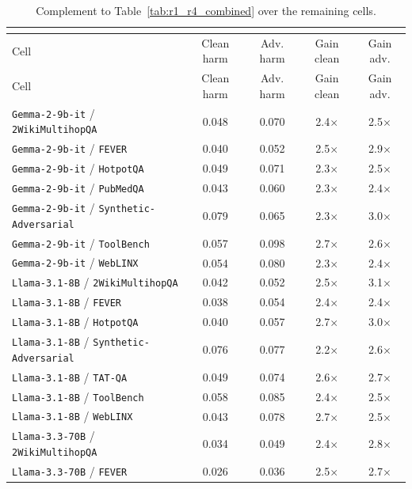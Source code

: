 \begin{longtable}{lcccc}
\caption{\small Complement to Table~\ref{tab:r1_r4_combined} over the remaining cells.}\\
\label{tab:appendix_remaining_50_r1r4}\\
\toprule
Cell & Clean harm & Adv. harm & Gain clean & Gain adv. \\
\midrule
\endfirsthead
\toprule
Cell & Clean harm & Adv. harm & Gain clean & Gain adv. \\
\midrule
\endhead
\texttt{Gemma-2-9b-it} / \texttt{2WikiMultihopQA} & 0.048 & 0.070 & 2.4$\times$ & 2.5$\times$ \\
\texttt{Gemma-2-9b-it} / \texttt{FEVER} & 0.040 & 0.052 & 2.5$\times$ & 2.9$\times$ \\
\texttt{Gemma-2-9b-it} / \texttt{HotpotQA} & 0.049 & 0.071 & 2.3$\times$ & 2.5$\times$ \\
\texttt{Gemma-2-9b-it} / \texttt{PubMedQA} & 0.043 & 0.060 & 2.3$\times$ & 2.4$\times$ \\
\texttt{Gemma-2-9b-it} / \texttt{Synthetic-Adversarial} & 0.079 & 0.065 & 2.3$\times$ & 3.0$\times$ \\
\texttt{Gemma-2-9b-it} / \texttt{ToolBench} & 0.057 & 0.098 & 2.7$\times$ & 2.6$\times$ \\
\texttt{Gemma-2-9b-it} / \texttt{WebLINX} & 0.054 & 0.080 & 2.3$\times$ & 2.4$\times$ \\
\texttt{Llama-3.1-8B} / \texttt{2WikiMultihopQA} & 0.042 & 0.052 & 2.5$\times$ & 3.1$\times$ \\
\texttt{Llama-3.1-8B} / \texttt{FEVER} & 0.038 & 0.054 & 2.4$\times$ & 2.4$\times$ \\
\texttt{Llama-3.1-8B} / \texttt{HotpotQA} & 0.040 & 0.057 & 2.7$\times$ & 3.0$\times$ \\
\texttt{Llama-3.1-8B} / \texttt{Synthetic-Adversarial} & 0.076 & 0.077 & 2.2$\times$ & 2.6$\times$ \\
\texttt{Llama-3.1-8B} / \texttt{TAT-QA} & 0.049 & 0.074 & 2.6$\times$ & 2.7$\times$ \\
\texttt{Llama-3.1-8B} / \texttt{ToolBench} & 0.058 & 0.085 & 2.4$\times$ & 2.5$\times$ \\
\texttt{Llama-3.1-8B} / \texttt{WebLINX} & 0.043 & 0.078 & 2.7$\times$ & 2.5$\times$ \\
\texttt{Llama-3.3-70B} / \texttt{2WikiMultihopQA} & 0.034 & 0.049 & 2.4$\times$ & 2.8$\times$ \\
\texttt{Llama-3.3-70B} / \texttt{FEVER} & 0.026 & 0.036 & 2.5$\times$ & 2.7$\times$ \\

\end{longtable}
